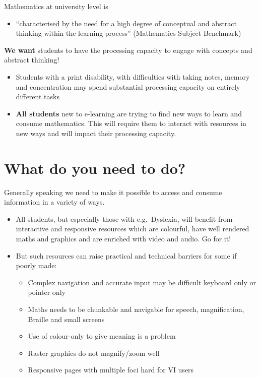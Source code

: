 \documentclass[
  17pt,
  english,
  a4paper]{extarticle}
\providecommand{\tightlist}{%
  \setlength{\itemsep}{0pt}\setlength{\parskip}{0pt}}
\theoremstyle{plain}
\theoremstyle{plain}
\theoremstyle{plain}
\theoremstyle{plain}
\theoremstyle{plain}
\theoremstyle{definition}
\theoremstyle{definition}
\theoremstyle{definition}
\theoremstyle{remark}
\renewcommand{\;}{\,}
\begin{document}
Mathematics at university level is

\begin{itemize}
\tightlist
\item
  ``characterised by the need for a high degree of conceptual and abstract thinking within the learning process'' (Mathematics Subject Benchmark)
\end{itemize}

\textbf{We want} students to have the processing capacity to engage with concepts and abstract thinking!

\begin{itemize}
\item
  Students with a print disability, with difficulties with taking notes, memory and concentration may spend substantial processing capacity on entirely different tasks
\item
  \textbf{All students} new to e-learning are trying to find new ways to learn and consume mathematics. This will require them to interact with resources in new ways and will impact their processing capacity.
\end{itemize}

\hypertarget{what-do-you-need-to-do}{%
\section{What do you need to do?}\label{what-do-you-need-to-do}}

Generally speaking we need to make it possible to access and consume information in a variety of ways.

\begin{itemize}
\tightlist
\item
  All students, but especially those with e.g.~Dyslexia, will benefit from interactive and responsive resources which are colourful, have well rendered maths and graphics and are enriched with video and audio. Go for it!
\item
  But such resources can raise practical and technical barriers for some if poorly made:

  \begin{itemize}
  \tightlist
  \item
    Complex navigation and accurate input may be difficult keyboard only or pointer only
  \item
    Maths needs to be chunkable and navigable for speech, magnification, Braille and small screens
  \item
    Use of colour-only to give meaning is a problem
  \item
    Raster graphics do not magnify/zoom well
  \item
    Responsive pages with multiple foci hard for VI users
  \end{itemize}
\end{itemize}
\end{document}
